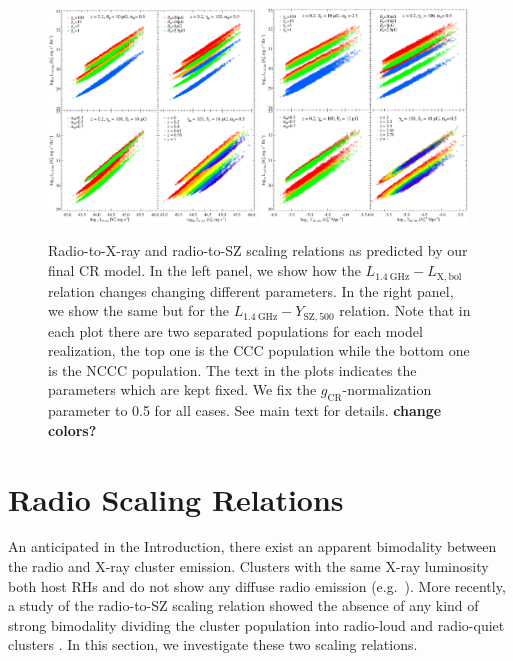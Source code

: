 \documentclass[traditabstract]{aa}
\newcommand{\rmn}{\mathrm}
\begin{document}
\begin{figure}[t]
\centering
\includegraphics[width=0.49\textwidth]{figures/PL_relation_testing_gimp.eps}
\includegraphics[width=0.49\textwidth]{figures/PSZ_relation_testing_gimp.eps}
\caption{Radio-to-X-ray and radio-to-SZ scaling relations as predicted
  by our final CR model. In the left panel, we show how the
  $L_{1.4~\rmn{GHz}}-L_{\rmn{X,bol}}$ relation changes changing different
  parameters. In the right panel, we show the same but for the
  $L_{1.4~\rmn{GHz}}-Y_{\rmn{SZ},500}$ relation. Note that in each plot there
  are two separated populations for each model realization, the top one is the
  CCC population while the bottom one is the NCCC population. The text in the
  plots indicates the parameters which are kept fixed. We fix the
  $g_{\rmn{CR}}$-normalization parameter to 0.5 for all cases. See main text for
  details. {\bf change colors?}}
\label{fig:SR}
\end{figure}


\section{Radio Scaling Relations}
\label{sec:4}
An anticipated in the Introduction, there exist an apparent bimodality between the radio and X-ray cluster emission. Clusters with the same X-ray luminosity both host RHs and do not show any diffuse radio emission (e.g.~\citealp{2009A&A...507..661B,2011A&A...527A..99E}). More recently, a study of the radio-to-SZ scaling relation showed the absence of any kind of strong bimodality dividing the cluster population into radio-loud and radio-quiet clusters \citep{2012MNRAS.421L.112B}. In this section, we investigate these two scaling relations.
\end{document}
